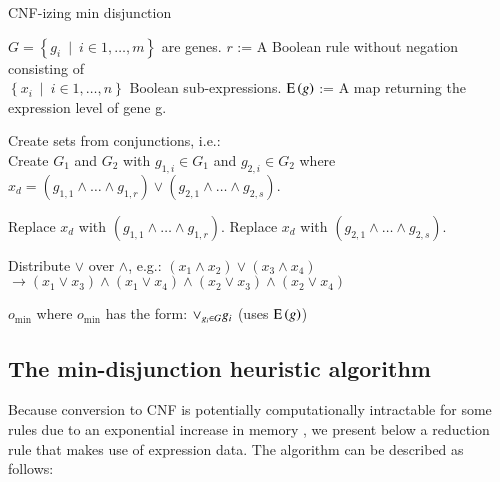 \begin{algorithm}
\caption{CNF-izing min disjunction}
\label{alg:ReductionToCNF}
\begin{algorithmic}
\INPUT $G = \left\{g_i~\mid~i \in{1, \ldots, m}\right\}$ are genes. 
\INPUT $r$ := A Boolean rule without negation consisting of\\
  $\left\{x_i~\mid~i \in{1, \ldots, n}\right\}$ Boolean sub-expressions.
\INPUT $\operatorname{E}\left(g\right)$ := A map returning the expression level of gene g.
  \State \parbox[t]{\dimexpr\linewidth-\algorithmicindent}{
    Create sets from conjunctions, i.e.:\\
    Create $G_1$ and $G_2$ with $g_{1,i} \in G_1$ 
    and $g_{2,i} \in G_2$ where\\ 
    $x_d = (g_{1,1} \land \ldots \land g_{1,r}) \lor 
    (g_{2,1} \land \ldots \land g_{2,s})$. 
    \strut}
    \State Replace $x_d$ with $(g_{1,1} \land \ldots \land g_{1,r})$.
    \State Replace $x_d$ with $(g_{2,1} \land \ldots \land g_{2,s})$.
    \EndIf 
  \EndIf
  \State \parbox[t]{\dimexpr\linewidth-\algorithmicindent}{
    Distribute $\lor$ over $\land$, e.g.: $(x_1 \land x_2) \lor (x_3 \land x_4)$ \\ 
    $\rightarrow (x_1 \lor x_3) \land (x_1 \lor x_4) \land 
    (x_2 \lor x_3) \land (x_2 \lor x_4)$
    \strut}
\EndWhile
\OUTPUT $o_{\min}$ where $o_{\min}$ has the form: $\lor_{g_i \in G} g_i$ (uses $\operatorname{E}\left(g\right)$)
\end{algorithmic} 
\end{algorithm}


\subsection{The min-disjunction heuristic algorithm}
\label{sec:HeuristicToCNF}
Because conversion to CNF is potentially computationally intractable 
for some rules due to an  exponential increase in memory \citep{Russell2009}, we
present below a reduction rule that makes use of expression data.
The algorithm can be described as follows:

